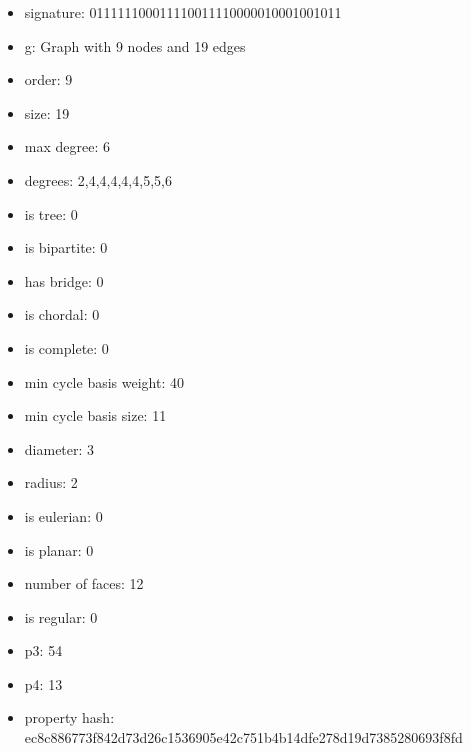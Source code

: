 \newpage
\begin{figure}
\end{figure}
\begin{itemize}
\item signature: 011111100011110011110000010001001011
\item g: Graph with 9 nodes and 19 edges
\item order: 9
\item size: 19
\item max degree: 6
\item degrees: 2,4,4,4,4,4,5,5,6
\item is tree: 0
\item is bipartite: 0
\item has bridge: 0
\item is chordal: 0
\item is complete: 0
\item min cycle basis weight: 40
\item min cycle basis size: 11
\item diameter: 3
\item radius: 2
\item is eulerian: 0
\item is planar: 0
\item number of faces: 12
\item is regular: 0
\item p3: 54
\item p4: 13
\item property hash: ec8c886773f842d73d26c1536905e42c751b4b14dfe278d19d7385280693f8fd
\end{itemize}
